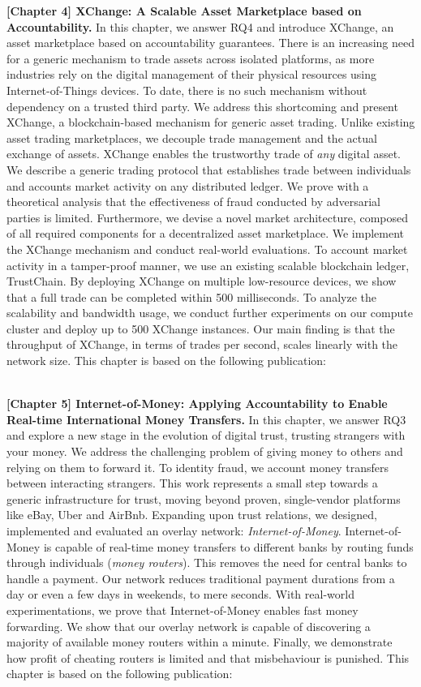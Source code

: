 \textbf{[Chapter 4] XChange: A Scalable Asset Marketplace based on Accountability.}
In this chapter, we answer RQ4 and introduce XChange, an asset marketplace based on accountability guarantees.
There is an increasing need for a generic mechanism to trade assets across isolated platforms, as more industries rely on the digital management of their physical resources using Internet-of-Things devices.
To date, there is no such mechanism without dependency on a trusted third party.
We address this shortcoming and present XChange, a blockchain-based mechanism for generic asset trading.
Unlike existing asset trading marketplaces, we decouple trade management and the actual exchange of assets.
XChange enables the trustworthy trade of \emph{any} digital asset.
We describe a generic trading protocol that establishes trade between individuals and accounts market activity on any distributed ledger.
We prove with a theoretical analysis that the effectiveness of fraud conducted by adversarial parties is limited.
Furthermore, we devise a novel market architecture, composed of all required components for a decentralized asset marketplace.
We implement the XChange mechanism and conduct real-world evaluations.
To account market activity in a tamper-proof manner, we use an existing scalable blockchain ledger, TrustChain.
By deploying XChange on multiple low-resource devices, we show that a full trade can be completed within 500 milliseconds.
To analyze the scalability and bandwidth usage, we conduct further experiments on our compute cluster and deploy up to 500 XChange instances.
Our main finding is that the throughput of XChange, in terms of trades per second, scales linearly with the network size.
This chapter is based on the following publication:

\\

\textbf{[Chapter 5] Internet-of-Money: Applying Accountability to Enable Real-time International Money Transfers.}
In this chapter, we answer RQ3 and explore a new stage in the evolution of digital trust, trusting strangers with your money.
We address the challenging problem of giving money to others and relying on them to forward it.
To identity fraud, we account money transfers between interacting strangers.
This work represents a small step towards a generic infrastructure for trust, moving beyond proven, single-vendor platforms like eBay, Uber and AirBnb.
Expanding upon trust relations, we designed, implemented and evaluated an overlay network: \emph{Internet-of-Money}.
Internet-of-Money is capable of real-time money transfers to different banks by routing funds through individuals (\emph{money routers}).
This removes the need for central banks to handle a payment.
Our network reduces traditional payment durations from a day or even a few days in weekends, to mere seconds.
With real-world experimentations, we prove that Internet-of-Money enables fast money forwarding.
We show that our overlay network is capable of discovering a majority of available money routers within a minute.
Finally, we demonstrate how profit of cheating routers is limited and that misbehaviour is punished.
This chapter is based on the following publication:


